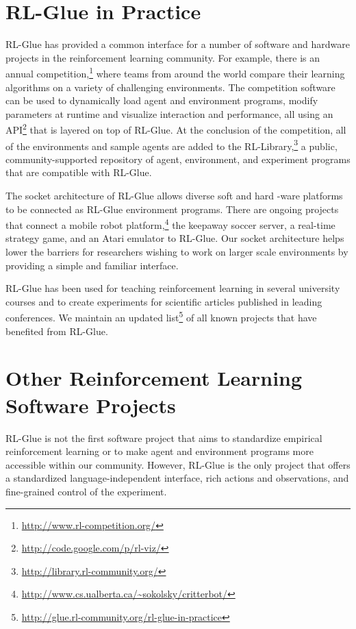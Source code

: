 \documentclass[twoside,11pt]{article}
\begin{document}
\section{RL-Glue in Practice}
RL-Glue has provided a common interface for a number of software and hardware projects in the reinforcement learning community.  For example, there is an annual competition,\footnote{\url{http://www.rl-competition.org/}} where teams from around the world compare their learning algorithms on a variety of challenging environments.  The competition software can be used to dynamically load agent and environment programs, modify parameters at runtime and visualize interaction and performance, all using an API\footnote{\url{http://code.google.com/p/rl-viz/}} that is layered on top of RL-Glue.  At the conclusion of the competition, all of the environments and sample agents are added to the RL-Library,\footnote{\url{http://library.rl-community.org/}} a public, community-supported repository of agent, environment, and experiment programs that are compatible with RL-Glue.



The socket architecture of RL-Glue allows diverse soft and hard -ware platforms to be connected as RL-Glue environment programs.  There are ongoing projects that connect a mobile robot platform,\footnote{\url{http://www.cs.ualberta.ca/~sokolsky/critterbot/}} the keepaway soccer server, a real-time strategy game, and an Atari emulator to RL-Glue. Our socket architecture helps lower the barriers for researchers wishing to work on larger scale environments by providing a simple and familiar interface. %

RL-Glue has been used for teaching reinforcement learning in several university courses and to create experiments for scientific articles published in leading conferences. We maintain an updated list\footnote{\url{http://glue.rl-community.org/rl-glue-in-practice}} of all known projects that have benefited from RL-Glue.



\section{Other Reinforcement Learning Software Projects}
RL-Glue is not the first software project that aims to  standardize empirical reinforcement learning or to make agent and environment programs more accessible within our community.  However, RL-Glue is the only project that offers a standardized language-independent interface, rich actions and observations, and fine-grained control of the experiment.
\end{document}
